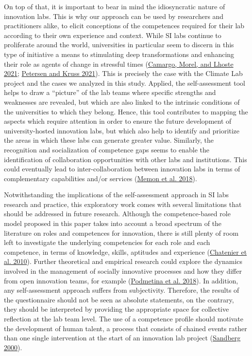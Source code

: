 \documentclass[AMA,STIX1COL,APA,STIX2COL]{WileyNJD-v2}
\begin{document}
On top of that, it is important to bear in mind the idiosyncratic nature
of innovation labs. This is why our approach can be used by researchers
and practitioners alike, to elicit conceptions of the competences
required for their lab according to their own experience and context.
While SI labs continue to proliferate around the world, universities in
particular seem to discern in this type of initiative a means to
stimulating deep transformations and enhancing their role as agents of
change in stressful times (\protect\hyperlink{ref-Camargo2021}{Camargo,
Morel, and Lhoste 2021}; \protect\hyperlink{ref-Petersen2021}{Petersen
and Kruss 2021}). This is precisely the case with the Climate Lab
project and the cases we analyzed in this study. Applied, the
self-assessment tool helps to draw a ``picture'' of the lab teams where
specific strengths and weaknesses are revealed, but which are also
linked to the intrinsic conditions of the universities to which they
belong. Hence, this tool contributes to mapping the aspects which
require attention in order to ensure the future development of
university-hosted innovation labs, but which also help to identify and
prioritize the areas in which these labs can generate greater value.
Similarly, the recognition and socialization of competence gaps seems to
enable the identification of collaboration opportunities with other labs
and institutions. This could eventually lead to inter-collaboration
between innovation labs in terms of complementary capabilities and/or
services (\protect\hyperlink{ref-Memon2018}{Memon et al. 2018}).

Notwithstanding the implications of the self-assessment approach in SI
labs research and practice, this exploratory work comes with several
limitations that should be addressed in future research. Although the
competence-based role model proposed in this paper takes into account a
broad spectrum of the literature on roles and competences for
innovation, there is still plenty of room left to investigate the
underlying competencies for each role and each competence, in terms of
knowledge, skills, aptitudes and experience
(\protect\hyperlink{ref-Chatenier2010}{Chatenier et al. 2010}). Further
theoretical and empirical research could explore the dynamics involved
in the management of socially innovative processes and how they differ
from open innovation teams, for example
(\protect\hyperlink{ref-Podmetina2018}{Podmetina et al. 2018}). In
addition, any self-assessment approach suffers from subjectivity.
Therefore, the results of the questionnaire should not be seen as
absolute statements, on the contrary, they should be interpreted by
providing the appropriate space for collective reflection at the lab
team level. The use of a competence profile should motivate the
development of human talent, a process that consists of chained events
rather than one single intervention at the start of an innovation lab
project (\protect\hyperlink{ref-Sandberg2000}{Sandberg 2000}).
\end{document}

